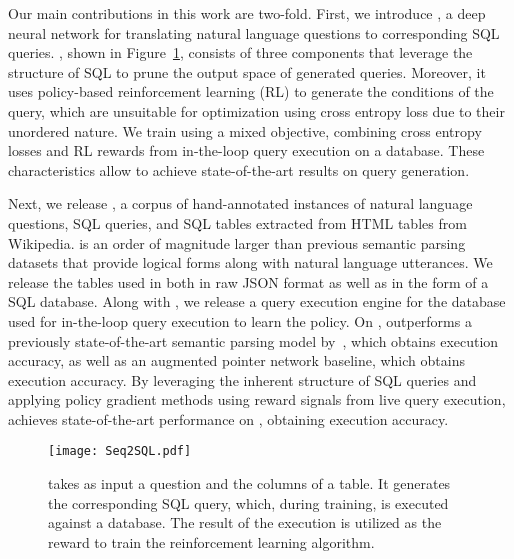 \documentclass{article} %
\begin{document}
Our main contributions in this work are two-fold.
First, we introduce \model, a deep neural network for translating natural language questions to corresponding SQL queries.
\model, shown in Figure~\ref{fig:seq2sql}, consists of three components that leverage the structure of SQL to prune the output space of generated queries.
Moreover, it uses policy-based reinforcement learning (RL) to generate the conditions of the query, which are unsuitable for optimization using cross entropy loss due to their unordered nature.
We train \model using a mixed objective, combining cross entropy losses and RL rewards from in-the-loop query execution on a database.
These characteristics allow \model to achieve state-of-the-art results on query generation.


Next, we release \dataset, a corpus of \numinstances hand-annotated instances of natural language questions, SQL queries, and SQL tables extracted from \numtables HTML tables from Wikipedia.
\dataset is an order of magnitude larger than previous semantic parsing datasets that provide logical forms along with natural language utterances.
We release the tables used in \dataset both in raw JSON format as well as in the form of a SQL database.
Along with \dataset, we release a query execution engine for the database used for in-the-loop query execution to learn the policy.
On \dataset, \model outperforms a previously state-of-the-art semantic parsing model by~\citet{dong-neural_semantic_parsing}, which obtains \perfeaseqtoseq execution accuracy, as well as an augmented pointer network baseline, which obtains \perfeapointer execution accuracy.
By leveraging the inherent structure of SQL queries and applying policy gradient methods using reward signals from live query execution, \model achieves state-of-the-art performance on \dataset, obtaining \perfeaours execution accuracy.


\begin{figure}[t!] 
  \begin{center}
	\texttt{[image: Seq2SQL.pdf]}
  \end{center}
  \vspace{-2mm}
  \caption{
\model takes as input a question and the columns of a table.
It generates the corresponding SQL query, which, during training, is executed against a database.
The result of the execution is utilized as the reward to train the reinforcement learning algorithm.
}\label{fig:seq2sql}
  \vspace{-0mm}
\end{figure}
\end{document}
